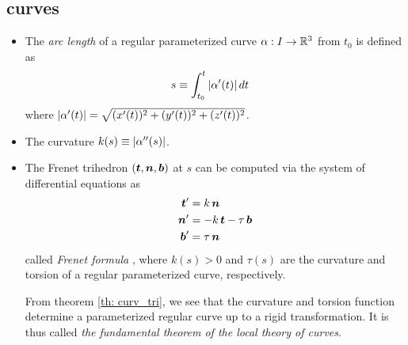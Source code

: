 \documentclass[11pt]{article}
\begin{document}
\subsection{curves}
\begin{itemize}
\item The \emph{arc length} of a regular parameterized curve $\alpha: I \rightarrow {\mathbb R}^{3}$ from $t_{0}$ is defined as
\begin{align}
s &\equiv \int_{t_{0}}^{t}\left\lvert \alpha'(t) \right\rvert dt  \label{eqn: arc_leng_1}
\end{align} where $\left\lvert \alpha'(t) \right\rvert = \sqrt{(x'(t))^{2} + (y'(t))^{2}+ (z'(t))^{2}}$.

\item The curvature $k(s) \equiv \left\lvert \alpha''(s) \right\rvert$.

\item The Frenet trihedron $(\boldsymbol{t}, \boldsymbol{n}, \boldsymbol{b})$ at $s$ can be computed via the system of differential equations as 
\begin{align}
\boldsymbol{t}' &= k\,\boldsymbol{n}\nonumber\\
\boldsymbol{n}' &= -k\,\boldsymbol{t} - \tau\,\boldsymbol{b}\nonumber\\
\boldsymbol{b}' &= \tau\,\boldsymbol{n} \label{eqn: Frenet_formula}
\end{align}
called \emph{Frenet formula} \citep{do1976differential}, where $k(s)>0$ and $\tau(s)$ are the curvature and torsion of a regular parameterized curve, respectively.  

From theorem \ref{th: curv_tri}, we see that the curvature and torsion function determine a parameterized regular curve up to a rigid transformation.  It is thus called \emph{the fundamental theorem of the local theory of curves}.
\end{itemize}
\end{document}

